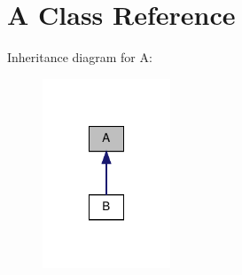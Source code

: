 \hypertarget{classA}{\section{A Class Reference}
\label{classA}
}


Inheritance diagram for A\-:\nopagebreak
\begin{figure}[H]
\begin{center}
\leavevmode
\includegraphics[width=108pt]{classA__inherit__graph}
\end{center}
\end{figure}
